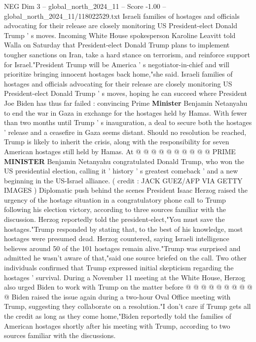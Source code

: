 \begin{textsample}{NEG Dim 3 – global\_north\_2024\_11 – Score -1.00 – global\_north\_2024\_11/118022529.txt}  \label{ex:f3_neg_280}
Israeli families of hostages and officials advocating for their release are closely monitoring US President-elect Donald Trump ' s moves.
Incoming White House spokesperson Karoline Leavitt told Walla on Saturday that President-elect Donald Trump plans to implement tougher sanctions on Iran, take a hard stance on terrorism, and reinforce support for Israel."President Trump will be America ' s negotiator-in-chief and will prioritize bringing innocent hostages back home,"she said.
Israeli families of hostages and officials advocating for their release are closely monitoring US President-elect Donald Trump ' s moves, hoping he can succeed where President Joe Biden has thus far failed : convincing Prime \textbf{Minister} Benjamin Netanyahu to end the war in Gaza in exchange for the hostages held by Hamas.
With fewer than two months until Trump ' s inauguration, a deal to secure both the hostages ' release and a ceasefire in Gaza seems distant.
Should no resolution be reached, Trump is likely to inherit the crisis, along with the responsibility for seven American hostages still held by Hamas.
At @ @ @ @ @ @ @ @ @ @ PRIME \textbf{MINISTER} Benjamin Netanyahu congratulated Donald Trump, who won the US presidential election, calling it ' history ' s greatest comeback ' and a new beginning in the US-Israel alliance. ( credit : JACK GUEZ/AFP VIA GETTY IMAGES ) Diplomatic push behind the scenes President Isaac Herzog raised the urgency of the hostage situation in a congratulatory phone call to Trump following his election victory, according to three sources familiar with the discussion.
Herzog reportedly told the president-elect,"You must save the hostages."Trump responded by stating that, to the best of his knowledge, most hostages were presumed dead.
Herzog countered, saying Israeli intelligence believes around 50 of the 101 hostages remain alive."Trump was surprised and admitted he wasn't aware of that,"said one source briefed on the call.
Two other individuals confirmed that Trump expressed initial skepticism regarding the hostages ' survival.
During a November 11 meeting at the White House, Herzog also urged Biden to work with Trump on the matter before @ @ @ @ @ @ @ @ @ @ Biden raised the issue again during a two-hour Oval Office meeting with Trump, suggesting they collaborate on a resolution."I don't care if Trump gets all the credit as long as they come home,"Biden reportedly told the families of American hostages shortly after his meeting with Trump, according to two sources familiar with the discussions.

\end{textsample}
